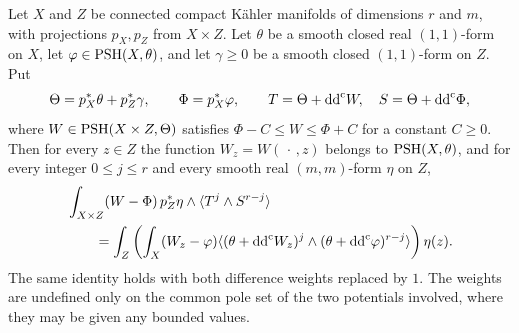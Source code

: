 \begin{corollary}\label{cor:compact-nonpluripolar-fibre-fubini}
Let $X$ and $Z$ be connected compact K\"ahler manifolds of dimensions $r$ and $m$, with projections $p_X,p_Z$ from $X\times Z$. Let $\theta$ be a smooth closed real $(1,1)$-form on $X$, let $\varphi\in\mathrm{PSH}(X,\theta)$, and let $\gamma\geq0$ be a smooth closed $(1,1)$-form on $Z$. Put
\[
 \Theta=p_X^*\theta+p_Z^*\gamma,\qquad
 \Phi=p_X^*\varphi,\qquad
 T=\Theta+\mathrm{dd}^{\mathrm{c}} W,\quad S=\Theta+\mathrm{dd}^{\mathrm{c}}\Phi,
\]
where $W\in\mathrm{PSH}(X\times Z,\Theta)$ satisfies $\Phi-C\leq W\leq\Phi+C$ for a constant $C\geq0$. Then for every $z\in Z$ the function $W_z=W(\,\cdot\,,z)$ belongs to $\mathrm{PSH}(X,\theta)$, and for every integer $0\leq j\leq r$ and every smooth real $(m,m)$-form $\eta$ on $Z$,
\begin{equation}\label{eq:compact-nonpluripolar-fibre-fubini}
 \begin{aligned}
 &\int_{X\times Z}(W-\Phi)\,p_Z^*\eta\wedge
                              \langle T^j\wedge S^{r-j}\rangle\\
 &\qquad=\int_Z\left(\int_X(W_z-\varphi)
            \langle(\theta+\mathrm{dd}^{\mathrm{c}} W_z)^j\wedge
                         (\theta+\mathrm{dd}^{\mathrm{c}}\varphi)^{r-j}\rangle\right)\eta(z).
 \end{aligned}
\end{equation}
The same identity holds with both difference weights replaced by $1$. The weights are undefined only on the common pole set of the two potentials involved, where they may be given any bounded values.
\end{corollary}
